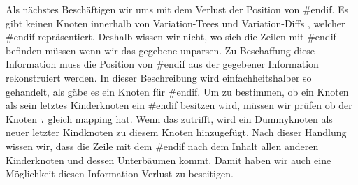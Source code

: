 Als nächstes Beschäftigen wir ums mit dem  Verlust der Position von \#endif. Es gibt keinen Knoten innerhalb von Variation-Trees und Variation-Diffs , welcher \#endif repräsentiert. Deshalb wissen wir nicht, wo sich die Zeilen mit \#endif befinden müssen wenn wir das gegebene unparsen. Zu Beschaffung diese Information muss die Position von \#endif aus der gegebener Information rekonstruiert werden. In dieser Beschreibung wird einfachheitshalber so gehandelt, als gäbe es ein Knoten für \#endif.  Um zu bestimmen, ob ein Knoten als sein letztes Kinderknoten ein \#endif besitzen wird, müssen wir prüfen ob der Knoten $\tau$ gleich mapping hat. Wenn das zutrifft, wird ein Dummyknoten als neuer letzter Kindknoten zu diesem Knoten hinzugefügt. Nach dieser Handlung wissen wir, dass die Zeile mit dem \#endif nach dem Inhalt allen anderen Kinderknoten und dessen Unterbäumen kommt. Damit haben wir auch eine Möglichkeit diesen Information-Verlust zu beseitigen.\\

